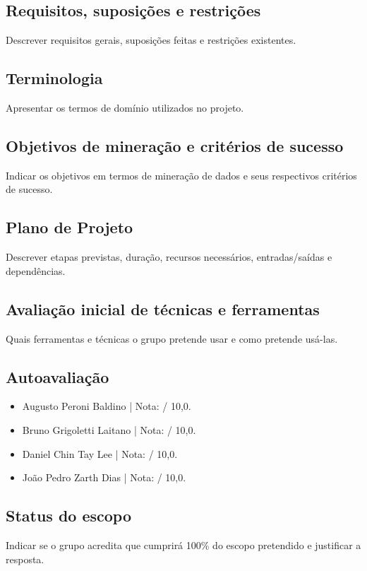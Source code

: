 \documentclass[12pt]{article}
\begin{document}
\subsection{Requisitos, suposições e restrições}
Descrever requisitos gerais, suposições feitas e restrições existentes.

\subsection{Terminologia}
Apresentar os termos de domínio utilizados no projeto.

\subsection{Objetivos de mineração e critérios de sucesso}
Indicar os objetivos em termos de mineração de dados e seus respectivos critérios de sucesso.

\subsection{Plano de Projeto}
Descrever etapas previstas, duração, recursos necessários, entradas/saídas e dependências.

\subsection{Avaliação inicial de técnicas e ferramentas}
Quais ferramentas e técnicas o grupo pretende usar e como pretende usá-las.

\subsection{Autoavaliação}
\begin{itemize}
    \item Augusto Peroni Baldino | Nota: \underline{\hspace{1cm}} / 10,0.
    \item Bruno Grigoletti Laitano | Nota: \underline{\hspace{1cm}} / 10,0.
    \item Daniel Chin Tay Lee | Nota: \underline{\hspace{1cm}} / 10,0.
    \item João Pedro Zarth Dias | Nota: \underline{\hspace{1cm}} / 10,0.
\end{itemize}

\subsection*{Status do escopo}
Indicar se o grupo acredita que cumprirá 100\% do escopo pretendido e justificar a resposta.
\end{document}

